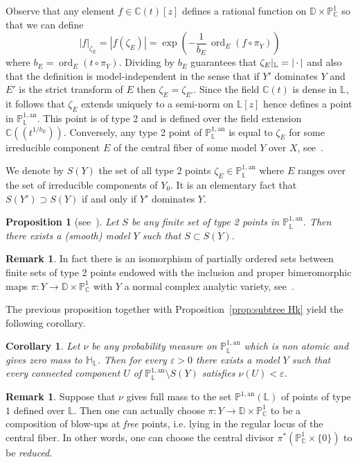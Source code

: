 \documentclass[11pt]{article}
\newtheorem{prop}[theo]{Proposition}
\newtheorem{coro}[theo]{Corollary}
\theoremstyle{definition}
\newtheorem{rema}[theo]{Remark}
\numberwithin{equation}{section}
\numberwithin{figure}{section}
\numberwithin{table}{section}
\DeclareMathOperator{\ord}{ord}
\newcommand{\cc}{\mathbb{C}}
\newcommand{\hh}{\mathbb{H}}
\newcommand{\D}{\mathbb{D}}
\newcommand{\an}{\mathrm{an}}
\newcommand{\e}{\varepsilon}
\newcommand{\abs}[1]{\left\vert#1\right\vert}
\newcommand{\PP}{\mathbb{P}}
\newcommand{\berkl}{\mathbb P^{1,\an}_{\Laurent}}
\newcommand{\Laurent}{\mathbb{L}}
\newcommand{\rest}[1]{ \arrowvert_{#1}}
\begin{document}
Observe that any element $f\in \cc(t)[z]$ defines a rational function on $\D \times \PP^1_\cc$ so that we can define
\[
\abs{f}_{\zeta_E} = |f(\zeta_E)| = \exp \left(- \frac1{b_E}\, \ord_E(f \circ \pi_Y)\right)
\]
where $b_E = \ord_E (t \circ \pi_Y)$. Dividing by $b_E$ guarantees that $\zeta_E\rest{\Laurent} = \abs{{\,\cdot\,}}$ and also that the definition is model-independent in the sense that if $Y'$ dominates $Y$ and $E'$ is the strict transform of $E$ then $\zeta_E=\zeta_{E'}$. Since the field $\cc(t)$ is dense in $\Laurent$, it follows that $\zeta_E$ extends uniquely to a semi-norm on $\Laurent[z]$ hence defines a point in $\PP^{1,\an}_{\Laurent}$. This point is of type 2 and is defined over the field extension $\cc(\!(t^{1/{b_E}})\!)$. Conversely, any type 2 point of $\PP^{1,\an}_{\Laurent}$ is equal to $\zeta_E$ for some irreducible component $E$ of the central fiber of some model $Y$ over $X$, see~\cite[Lem.~7.16]{NL}.

We denote by $ S(Y)$ the set of all type 2 points $\zeta_E \in \PP^{1,\an}_{\Laurent}$ where $E$ ranges over the set of irreducible components of $Y_0$. It is an elementary fact that $S(Y') \supset S(Y)$ if and only if $Y'$ dominates $Y$.

\begin{prop}[{see~\cite[\S 4.1]{demarco-faber-2}}]
Let $S$ be any finite set of type 2 points in $\PP^{1,\an}_{\Laurent}$. Then there exists a (smooth) model $Y$ such that $S \subset S(Y)$.
\end{prop}

\begin{rema}
In fact there is an isomorphism of partially ordered sets between finite sets of type 2 points endowed with the inclusion and proper bimeromorphic maps $\pi: Y \to \D \times \PP^1_\cc$ with $Y$ a normal complex analytic variety, see~\cite[Thm.~7.18]{NL}.
\end{rema}

The previous proposition together with Proposition~\ref{prop:subtree Hk} yield the following corollary.

\begin{coro}\label{cor:cut to small}
Let $\nu$ be any probability measure on $\berkl$ which is non atomic and gives zero mass to $\hh_\Laurent$. Then for every $\e>0$ there exists a model $Y$ such that every connected component $U$ of $\berkl\setminus S(Y)$ satisfies $\nu(U)<\e$.
\end{coro}

\begin{rema}\label{rem:useless}
Suppose that $\nu$ gives full mass to the set $\PP^{1,\an}(\Laurent)$ of points of type $1$ defined over $\Laurent$. Then one can actually choose $\pi: Y \to \D\times \PP^{1}_\cc $ to be a composition of blow-ups at \emph{free} points, i.e. lying in the regular locus of the central fiber. In other words, one can choose the central divisor $\pi^* (\PP^{1}_\cc \times \{ 0 \})$ to be \emph{reduced}.
\end{rema}
\end{document}
